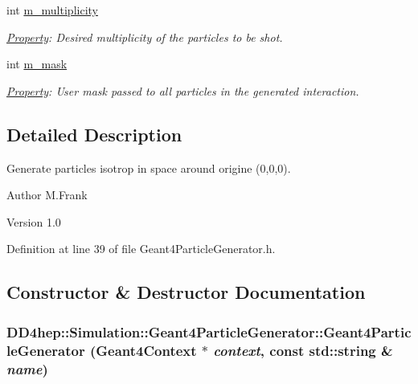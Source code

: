 \begin{DoxyCompactItemize}
int \hyperlink{class_d_d4hep_1_1_simulation_1_1_geant4_particle_generator_a366bf41f1de7a3e605ec7f2ecc220b39}{m\_\-multiplicity}
\begin{DoxyCompactList}\small\item\em \hyperlink{class_d_d4hep_1_1_property}{Property}: Desired multiplicity of the particles to be shot. \item\end{DoxyCompactList}\item 
int \hyperlink{class_d_d4hep_1_1_simulation_1_1_geant4_particle_generator_a725064da51fefbd1410e0d0e5292d6c8}{m\_\-mask}
\begin{DoxyCompactList}\small\item\em \hyperlink{class_d_d4hep_1_1_property}{Property}: User mask passed to all particles in the generated interaction. \item\end{DoxyCompactList}\end{DoxyCompactItemize}


\subsection{Detailed Description}
Generate particles isotrop in space around origine (0,0,0). \begin{DoxyAuthor}{Author}
M.Frank 
\end{DoxyAuthor}
\begin{DoxyVersion}{Version}
1.0 
\end{DoxyVersion}


Definition at line 39 of file Geant4ParticleGenerator.h.

\subsection{Constructor \& Destructor Documentation}
\hypertarget{class_d_d4hep_1_1_simulation_1_1_geant4_particle_generator_a2342c285b4e25be8f39c4759a3ad5b29}{
\subsubsection[{Geant4ParticleGenerator}]{\setlength{\rightskip}{0pt plus 5cm}DD4hep::Simulation::Geant4ParticleGenerator::Geant4ParticleGenerator ({\bf Geant4Context} $\ast$ {\em context}, \/  const std::string \& {\em name})}}
\label{class_d_d4hep_1_1_simulation_1_1_geant4_particle_generator_a2342c285b4e25be8f39c4759a3ad5b29}


